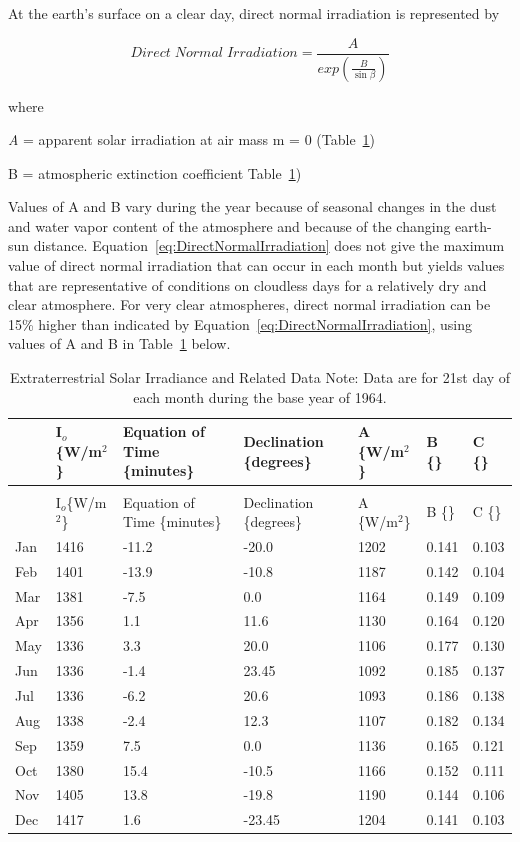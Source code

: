 At the earth's surface on a clear day, direct normal irradiation is represented by

\begin{equation}
Direct\;Normal\;Irradiation = \frac{A}{exp\left( \frac{B}{\sin \beta } \right)}
\label{eq:DirectNormalIrradiation}
\end{equation}

where

\emph{A} = apparent solar irradiation at air mass m = 0 (Table~\ref{table:extraterrestrial-solar-irradiance-and-related})

B = atmospheric extinction coefficient Table~\ref{table:extraterrestrial-solar-irradiance-and-related})

Values of A and B vary during the year because of seasonal changes in the dust and water vapor content of the atmosphere and because of the changing earth-sun distance. Equation~\ref{eq:DirectNormalIrradiation} does not give the maximum value of direct normal irradiation that can occur in each month but yields values that are representative of conditions on cloudless days for a relatively dry and clear atmosphere. For very clear atmospheres, direct normal irradiation can be 15\% higher than indicated by Equation~\ref{eq:DirectNormalIrradiation}, using values of A and B in Table~\ref{table:extraterrestrial-solar-irradiance-and-related} below.

\begin{longtable}[c]{p{0.75in}p{0.75in}p{0.75in}p{0.75in}p{0.75in}p{0.75in}p{0.75in}}
\caption{Extraterrestrial Solar Irradiance and Related Data Note: Data are for 21st day of each month during the base year of 1964. \label{table:extraterrestrial-solar-irradiance-and-related}}\\
\toprule 
~ & I\(_{o}\)\{W/m\(^{2}\)\} & Equation of Time \{minutes\} & Declination \{degrees\} & A \{W/m\(^{2}\)\} & B \{\} & C \{\} \tabularnewline
\midrule
\endfirsthead

\caption[]{Extraterrestrial Solar Irradiance and Related Data Note: Data are for 21st day of each month during the base year of 1964.} \tabularnewline
\toprule 
~ & I\(_{o}\)\{W/m\(^{2}\)\} & Equation of Time \{minutes\} & Declination \{degrees\} & A \{W/m\(^{2}\)\} & B \{\} & C \{\} \tabularnewline
\midrule
\endhead

Jan & 1416 & -11.2 & -20.0 & 1202 & 0.141 & 0.103 \tabularnewline
Feb & 1401 & -13.9 & -10.8 & 1187 & 0.142 & 0.104 \tabularnewline
Mar & 1381 & -7.5 & 0.0 & 1164 & 0.149 & 0.109 \tabularnewline
Apr & 1356 & 1.1 & 11.6 & 1130 & 0.164 & 0.120 \tabularnewline
May & 1336 & 3.3 & 20.0 & 1106 & 0.177 & 0.130 \tabularnewline
Jun & 1336 & -1.4 & 23.45 & 1092 & 0.185 & 0.137 \tabularnewline
Jul & 1336 & -6.2 & 20.6 & 1093 & 0.186 & 0.138 \tabularnewline
Aug & 1338 & -2.4 & 12.3 & 1107 & 0.182 & 0.134 \tabularnewline
Sep & 1359 & 7.5 & 0.0 & 1136 & 0.165 & 0.121 \tabularnewline
Oct & 1380 & 15.4 & -10.5 & 1166 & 0.152 & 0.111 \tabularnewline
Nov & 1405 & 13.8 & -19.8 & 1190 & 0.144 & 0.106 \tabularnewline
Dec & 1417 & 1.6 & -23.45 & 1204 & 0.141 & 0.103 \tabularnewline
\bottomrule
\end{longtable}

